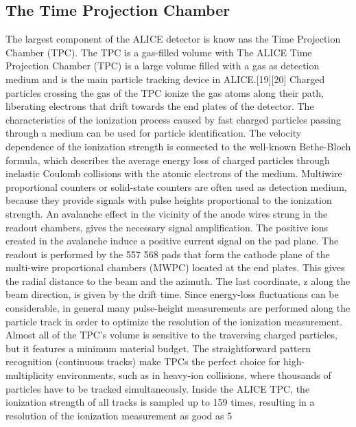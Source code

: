 \subsection{The Time Projection Chamber}
The largest component of the ALICE detector is know nas the Time Projection Chamber (TPC). The TPC is a gas-filled volume with 
The ALICE Time Projection Chamber (TPC) is a large volume filled with a gas as detection medium and is the main particle tracking device in ALICE.[19][20]
Charged particles crossing the gas of the TPC ionize the gas atoms along their path, liberating electrons that drift towards the end plates of the detector. The characteristics of the ionization process caused by fast charged particles passing through a medium can be used for particle identification. The velocity dependence of the ionization strength is connected to the well-known Bethe-Bloch formula, which describes the average energy loss of charged particles through inelastic Coulomb collisions with the atomic electrons of the medium.
Multiwire proportional counters or solid-state counters are often used as detection medium, because they provide signals with pulse heights proportional to the ionization strength. An avalanche effect in the vicinity of the anode wires strung in the readout chambers, gives the necessary signal amplification. The positive ions created in the avalanche induce a positive current signal on the pad plane. The readout is performed by the 557 568 pads that form the cathode plane of the multi-wire proportional chambers (MWPC) located at the end plates. This gives the radial distance to the beam and the azimuth. The last coordinate, z along the beam direction, is given by the drift time. Since energy-loss fluctuations can be considerable, in general many pulse-height measurements are performed along the particle track in order to optimize the resolution of the ionization measurement.
Almost all of the TPC's volume is sensitive to the traversing charged particles, but it features a minimum material budget. The straightforward pattern recognition (continuous tracks) make TPCs the perfect choice for high-multiplicity environments, such as in heavy-ion collisions, where thousands of particles have to be tracked simultaneously. Inside the ALICE TPC, the ionization strength of all tracks is sampled up to 159 times, resulting in a resolution of the ionization measurement as good as 5%
